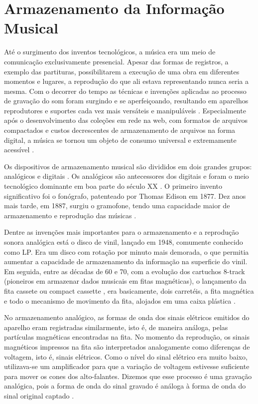 \section{Armazenamento da Informação Musical}

Até o surgimento dos inventos tecnológicos, a música era um meio de comunicação exclusivamente presencial. Apesar das formas de registros, a exemplo das partituras, possibilitarem a execução de uma obra em diferentes momentos e lugares, a reprodução do que ali estava representando nunca seria a mesma. Com o decorrer do tempo as técnicas e invenções aplicadas ao processo de gravação do som foram surgindo e se aperfeiçoando, resultando em aparelhos reprodutores e suportes cada vez mais versáteis e manipuláveis \cite{daquino2012}. Especialmente após o desenvolvimento das coleções em rede na web, com formatos de arquivos compactados e custos decrescentes de armazenamento de arquivos na forma digital, a música se tornou um objeto de consumo universal e extremamente acessível \cite{gomes2015}.

Os dispositivos de armazenamento musical são divididos em dois grandes grupos: analógicos e digitais \cite{andrade&crispim2008}. Os analógicos são antecessores dos digitais e foram o meio tecnológico dominante em boa parte do século XX \cite{paulozuben2004}. O primeiro invento significativo foi o fonógrafo, patenteado por Thomas Edison em 1877. Dez anos mais tarde, em 1887, surgiu o gramofone, tendo uma capacidade maior de armazenamento e reprodução das músicas \cite{marchi2005}. 

Dentre as invenções mais importantes para o armazenamento e a reprodução sonora analógica está o disco de vinil, lançado em 1948, comumente conhecido como LP. Era um disco com rotação por minuto mais demorada, o que permitia aumentar a capacidade de armazenamento da informação na superficie do vinil. Em seguida, entre as décadas de 60 e 70, com a evolução dos cartuchos 8-track (pioneiros em armazenar dados musicais em fitas magnéticas), o lançamento da fita cassete ou compact cassette \cite{marchi2005}, era basicamente, dois carretéis, a fita magnética e todo o mecanismo de movimento da fita, alojados em uma caixa plástica \cite{andrade&crispim2008}.

No armazenamento analógico, as formas de onda dos sinais elétricos emitidos do aparelho eram registradas similarmente, isto é, de maneira análoga, pelas partículas magnéticas encontradas na fita. No momento da reprodução, os sinais magnéticos impressos na fita são interpretados analogamente como diferenças de voltagem, isto é, sinais elétricos. Como o nível do sinal elétrico era muito baixo, utilizava-se um amplificador para que a variação de voltagem estivesse suficiente para mover os cones dos alto-falantes. Dizemos que esse processo é uma gravação analógica, pois a forma de onda do sinal gravado é análoga à forma de onda do sinal original captado \cite{paulozuben2004}.

